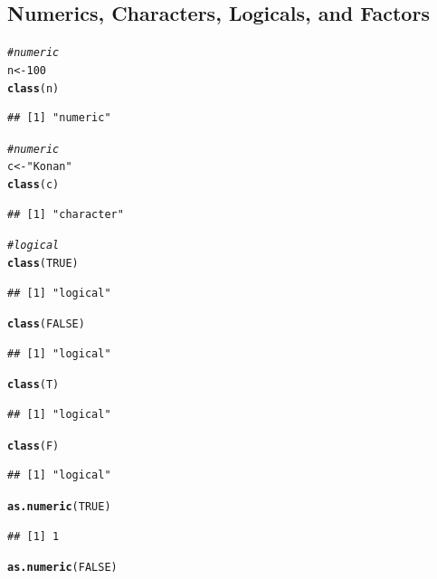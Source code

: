 \documentclass[11pt]{article}\usepackage[]{graphicx}\usepackage[]{color}
\makeatletter
\newcommand{\hlnum}[1]{\textcolor[rgb]{0.686,0.059,0.569}{#1}}%
\newcommand{\hlstr}[1]{\textcolor[rgb]{0.192,0.494,0.8}{#1}}%
\newcommand{\hlcom}[1]{\textcolor[rgb]{0.678,0.584,0.686}{\textit{#1}}}%
\newcommand{\hlstd}[1]{\textcolor[rgb]{0.345,0.345,0.345}{#1}}%
\newcommand{\hlkwb}[1]{\textcolor[rgb]{0.69,0.353,0.396}{#1}}%
\newcommand{\hlkwd}[1]{\textcolor[rgb]{0.737,0.353,0.396}{\textbf{#1}}}%
\newenvironment{kframe}{%
 \def\at@end@of@kframe{}%
 \ifinner\ifhmode%
  \def\at@end@of@kframe{\end{minipage}}%
  \begin{minipage}{\columnwidth}%
 \fi\fi%
 \def\FrameCommand##1{\hskip\@totalleftmargin \hskip-\fboxsep
 \colorbox{shadecolor}{##1}\hskip-\fboxsep
     \hskip-\linewidth \hskip-\@totalleftmargin \hskip\columnwidth}%
 \MakeFramed {\advance\hsize-\width
   \@totalleftmargin\z@ \linewidth\hsize
   \@setminipage}}%
 {\par\unskip\endMakeFramed%
 \at@end@of@kframe}
\newenvironment{knitrout}{}{} %
\makeatother
\begin{document}
\subsection{Numerics, Characters, Logicals, and Factors}

\begin{knitrout}
\color{fgcolor}\begin{kframe}
\begin{alltt}
\hlcom{# numeric}
\hlstd{n} \hlkwb{<-} \hlnum{100}
\hlkwd{class}\hlstd{(n)}
\end{alltt}
\begin{verbatim}
## [1] "numeric"
\end{verbatim}
\begin{alltt}
\hlcom{# numeric}
\hlstd{c} \hlkwb{<-} \hlstr{"Konan"}
\hlkwd{class}\hlstd{(c)}
\end{alltt}
\begin{verbatim}
## [1] "character"
\end{verbatim}
\begin{alltt}
\hlcom{# logical}
\hlkwd{class}\hlstd{(}\hlnum{TRUE}\hlstd{)}
\end{alltt}
\begin{verbatim}
## [1] "logical"
\end{verbatim}
\begin{alltt}
\hlkwd{class}\hlstd{(}\hlnum{FALSE}\hlstd{)}
\end{alltt}
\begin{verbatim}
## [1] "logical"
\end{verbatim}
\begin{alltt}
\hlkwd{class}\hlstd{(T)}
\end{alltt}
\begin{verbatim}
## [1] "logical"
\end{verbatim}
\begin{alltt}
\hlkwd{class}\hlstd{(F)}
\end{alltt}
\begin{verbatim}
## [1] "logical"
\end{verbatim}
\begin{alltt}
\hlkwd{as.numeric}\hlstd{(}\hlnum{TRUE}\hlstd{)}
\end{alltt}
\begin{verbatim}
## [1] 1
\end{verbatim}
\begin{alltt}
\hlkwd{as.numeric}\hlstd{(}\hlnum{FALSE}\hlstd{)}
\end{alltt}
\begin{verbatim}

\end{verbatim}
\end{kframe}
\end{knitrout}
\end{document}

